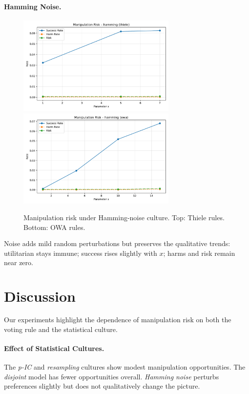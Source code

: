 \documentclass[11pt]{article}
\begin{document}
\paragraph{Hamming Noise.}
\begin{figure}[h!]
\centering
\includegraphics[width=0.7\textwidth]{figures/risk_hamming_thiele.pdf}
\includegraphics[width=0.7\textwidth]{figures/risk_hamming_owa.pdf}
\caption{Manipulation risk under Hamming-noise culture. Top: Thiele rules. Bottom: OWA rules.}
\end{figure}
Noise adds mild random perturbations but preserves the qualitative trends:
utilitarian stays immune; success rises slightly with $x$; harms and risk remain
near zero.

\section{Discussion}
Our experiments highlight the dependence of manipulation risk on both the
voting rule and the statistical culture.

\paragraph{Effect of Statistical Cultures.}
The \emph{p-IC} and \emph{resampling} cultures show modest manipulation opportunities.
The \emph{disjoint} model has fewer opportunities overall. \emph{Hamming noise} perturbs
preferences slightly but does not qualitatively change the picture.
\end{document}
